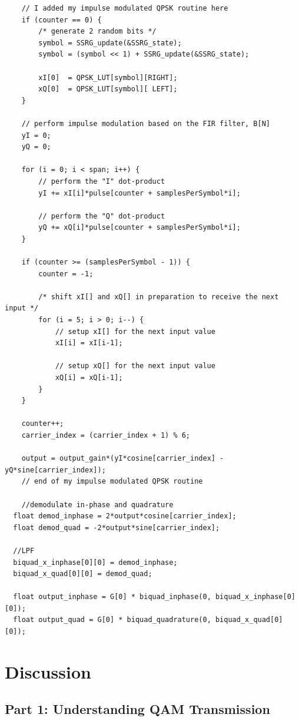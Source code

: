 \documentclass{article}
\begin{document}
\begin{verbatim}
	// I added my impulse modulated QPSK routine here
	if (counter == 0) {
		/* generate 2 random bits */
		symbol = SSRG_update(&SSRG_state); 
		symbol = (symbol << 1) + SSRG_update(&SSRG_state);

		xI[0]  = QPSK_LUT[symbol][RIGHT];  
		xQ[0]  = QPSK_LUT[symbol][ LEFT];   
	}

	// perform impulse modulation based on the FIR filter, B[N]
	yI = 0;
	yQ = 0;

	for (i = 0; i < span; i++) {
		// perform the "I" dot-product
		yI += xI[i]*pulse[counter + samplesPerSymbol*i];	

		// perform the "Q" dot-product
		yQ += xQ[i]*pulse[counter + samplesPerSymbol*i];	
	}

	if (counter >= (samplesPerSymbol - 1)) {
		counter = -1; 

		/* shift xI[] and xQ[] in preparation to receive the next input */
		for (i = 5; i > 0; i--) {
			// setup xI[] for the next input value
			xI[i] = xI[i-1];  

			// setup xQ[] for the next input value
			xQ[i] = xQ[i-1];  
		}
	}

	counter++;
	carrier_index = (carrier_index + 1) % 6;

	output = output_gain*(yI*cosine[carrier_index] - yQ*sine[carrier_index]);
	// end of my impulse modulated QPSK routine

	//demodulate in-phase and quadrature
  float demod_inphase = 2*output*cosine[carrier_index];
  float demod_quad = -2*output*sine[carrier_index];

  //LPF
  biquad_x_inphase[0][0] = demod_inphase;
  biquad_x_quad[0][0] = demod_quad;

  float output_inphase = G[0] * biquad_inphase(0, biquad_x_inphase[0][0]);
  float output_quad = G[0] * biquad_quadrature(0, biquad_x_quad[0][0]);
\end{verbatim}


\section{Discussion}

\subsection{Part 1: Understanding QAM Transmission}
\end{document}
